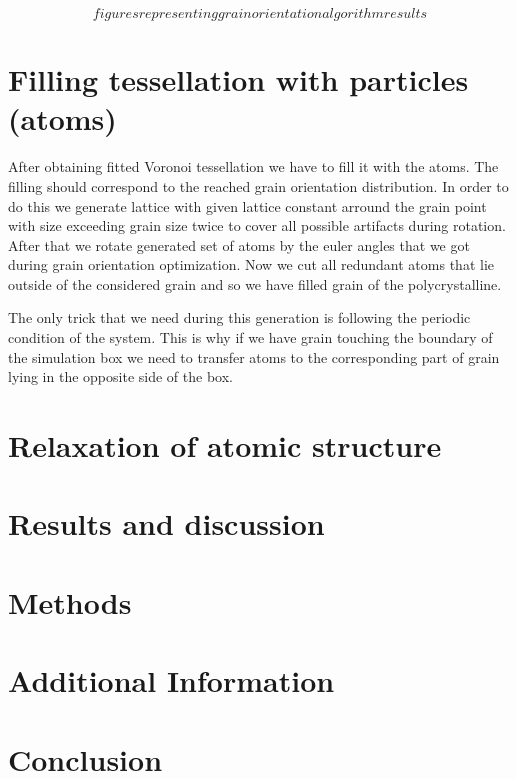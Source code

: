 \documentclass{article}
\begin{document}
\[figures representing grain orientation algorithm results\]

\section{Filling tessellation with particles (atoms)}

After obtaining fitted Voronoi tessellation we have to fill it with the atoms. The filling should correspond to the reached grain orientation distribution. In order to do this we generate lattice with given lattice constant arround the grain point with size exceeding grain size twice to cover all possible artifacts during rotation. After that we rotate generated set of atoms by the euler angles that we got during grain orientation optimization. Now we cut all redundant atoms that lie outside of the considered grain and so we have filled grain of the polycrystalline.

The only trick that we need during this generation is following the periodic condition of the system. This is why if we have grain touching the boundary of the simulation box we need to transfer atoms to the corresponding part of grain lying in the opposite side of the box.  

\section{Relaxation of atomic structure}


\section{Results and discussion}



\section{Methods}

\section{Additional Information}

\section{Conclusion}
\end{document}
